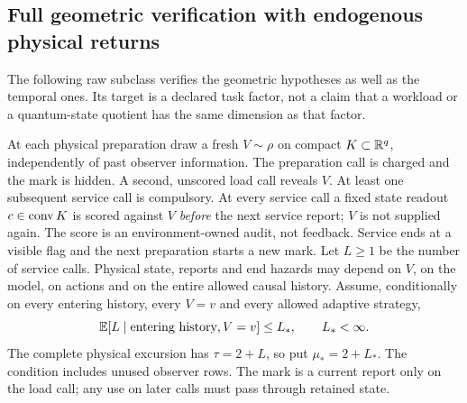 \subsection{Full geometric verification with endogenous physical returns}
The following raw subclass verifies the geometric hypotheses as well as the temporal ones. Its target is a declared task factor, not a claim that a workload or a quantum-state quotient has the same dimension as that factor.

At each physical preparation draw a fresh $V\sim\rho$ on compact $K\subset\mathbb R^q$, independently of past observer information. The preparation call is charged and the mark is hidden. A second, unscored load call reveals $V$. At least one subsequent service call is compulsory. At every service call a fixed state readout $c\in\operatorname{conv} K$ is scored against $V$ \emph{before} the next service report; $V$ is not supplied again. The score is an environment-owned audit, not feedback. Service ends at a visible flag and the next preparation starts a new mark. Let $L\ge1$ be the number of service calls. Physical state, reports and end hazards may depend on $V$, on the model, on actions and on the entire allowed causal history. Assume, conditionally on every entering history, every $V=v$ and every allowed adaptive strategy,
\begin{equation}\label{eq:load-mean}
 \mathbb E[L\mid\text{entering history},V=v]\le L_*,\qquad L_*<\infty.
\end{equation}
The complete physical excursion has $\tau=2+L$, so put $\mu_*=2+L_*$. The condition includes unused observer rows. The mark is a current report only on the load call; any use on later calls must pass through retained state.

